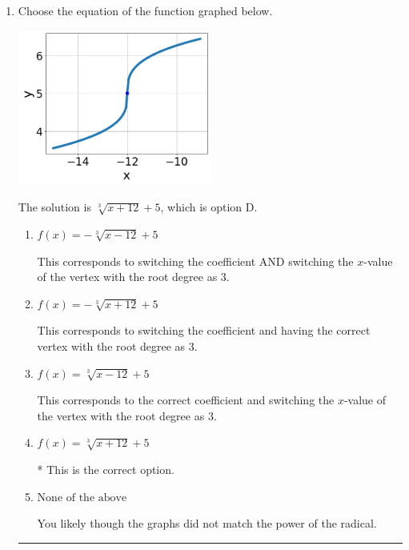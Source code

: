 \documentclass{extbook}[14pt]
\newcommand{\litem}[1]{\item #1

\rule{\textwidth}{0.4pt}}
\begin{document}
\begin{enumerate}\litem{
Choose the equation of the function graphed below.

\begin{center}
    \includegraphics[width=0.5\textwidth]{../Figures/radicalGraphToEquationCopyA.png}
\end{center}


The solution is \( \sqrt[3]{x + 12} + 5 \), which is option D.\begin{enumerate}[label=\Alph*.]
\item \( f(x) = - \sqrt[3]{x - 12} + 5 \)

This corresponds to switching the coefficient AND switching the $x$-value of the vertex with the root degree as $3$.
\item \( f(x) = - \sqrt[3]{x + 12} + 5 \)

This corresponds to switching the coefficient and having the correct vertex with the root degree as $3$.
\item \( f(x) = \sqrt[3]{x - 12} + 5 \)

This corresponds to the correct coefficient and switching the $x$-value of the vertex with the root degree as $3$.
\item \( f(x) = \sqrt[3]{x + 12} + 5 \)

* This is the correct option.
\item \( \text{None of the above} \)

You likely though the graphs did not match the power of the radical.
\end{enumerate}

}
\end{enumerate}
\end{document}
